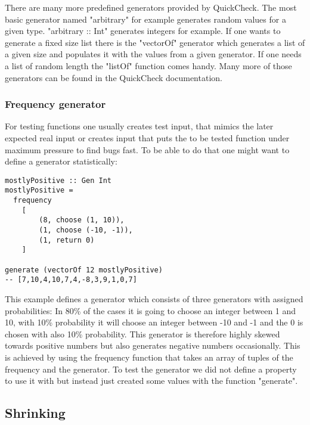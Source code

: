 \documentclass[a4paper, 12pt]{article} %
\begin{document}
There are many more predefined generators provided by QuickCheck. The most basic generator named "arbitrary" for example generates random values for a given type. "arbitrary :: Int" generates integers for example. If one wants to generate a fixed size list there is the "vectorOf" generator which generates a list of a given size and populates it with the values from a given generator. If one needs a list of random length the "listOf" function comes handy. Many more of those generators can be found in the QuickCheck documentation. \cite{documentation}

\subsubsection{Frequency generator}

For testing functions one usually creates test input, that mimics the later expected real input or creates input that puts the to be tested function under maximum pressure to find bugs fast. To be able to do that one might want to define a generator statistically:

\begin{verbatim}
mostlyPositive :: Gen Int
mostlyPositive =
  frequency
    [ 
        (8, choose (1, 10)),
        (1, choose (-10, -1)),
        (1, return 0)
    ]

generate (vectorOf 12 mostlyPositive) 
-- [7,10,4,10,7,4,-8,3,9,1,0,7]
\end{verbatim}

This example defines a generator which consists of three generators with assigned probabilities: In 80\% of the cases it is going to choose an integer between 1 and 10, with 10\% probability it will choose an integer between -10 and -1 and the 0 is chosen with also 10\% probability. This generator is therefore highly skewed towards positive numbers but also generates negative numbers occasionally. This is achieved by using the frequency function that takes an array of tuples of the frequency and the generator. To test the generator we did not define a property to use it with but instead just created some values with the function "generate".

\subsection{Shrinking}
\end{document}
